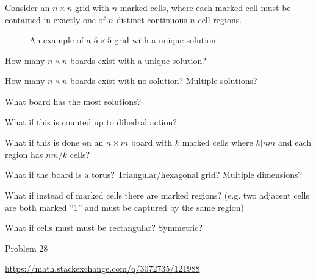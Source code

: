 \documentclass{article}
\begin{document}
  Consider an $n \times n$ grid with $n$ marked cells, where each marked cell
  must be contained in exactly one of $n$ distinct continuous $n$-cell regions.
\begin{figure}[ht!]
  \centering
  \caption{
    An example of a $5 \times 5$ grid with a unique solution.
  }
\end{figure}

\begin{question}
  How many $n \times n$ boards exist with a unique solution?
\end{question}

\begin{related}
  \item How many $n \times n$ boards exist with no solution? Multiple solutions?
  \item What board has the most solutions?
  \item What if this is counted up to dihedral action?
  \item What if this is done on an $n \times m$ board with $k$ marked cells where
  $k | nm$ and each region has $nm/k$ cells?
  \item What if the board is a torus? Triangular/hexagonal grid? Multiple dimensions?
  \item What if instead of marked cells there are marked regions? (e.g. two
  adjacent cells are both marked ``1'' and must be captured by the same region)
  \item What if cells must must be rectangular? Symmetric?
\end{related}


\begin{references}
  \item Problem 28
  \item \url{https://math.stackexchange.com/q/3072735/121988}
\end{references}
\end{document}
